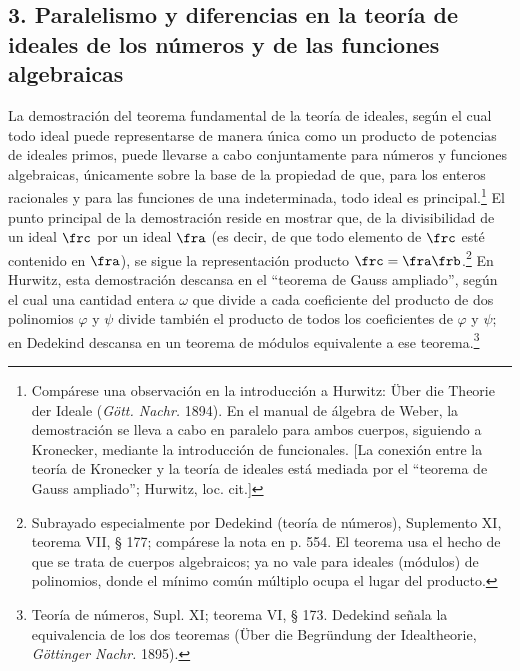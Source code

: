 \documentclass[11pt]{article}
\begin{document}
\subsection*{3. Paralelismo y diferencias en la teoría de ideales de los números y de las funciones algebraicas}
La demostración del teorema fundamental de la teoría de ideales, según el cual todo ideal puede representarse de manera única como un producto de potencias de ideales primos, puede llevarse a cabo conjuntamente para números y funciones algebraicas, únicamente sobre la base de la propiedad de que, para los enteros racionales y para las funciones de una indeterminada, todo ideal es principal.\footnote{Compárese una observación en la introducción a Hurwitz: Über die Theorie der Ideale (\emph{Gött. Nachr.} 1894). En el manual de álgebra de Weber, la demostración se lleva a cabo en paralelo para ambos cuerpos, siguiendo a Kronecker, mediante la introducción de funcionales. [La conexión entre la teoría de Kronecker y la teoría de ideales está mediada por el ``teorema de Gauss ampliado''; Hurwitz, loc. cit.]} El punto principal de la demostración reside en mostrar que, de la divisibilidad de un ideal \(\frc\) por un ideal \(\fra\) (es decir, de que todo elemento de \(\frc\) esté contenido en \(\fra\)), se sigue la representación producto \(\frc=\fra\frb\).\footnote{Subrayado especialmente por Dedekind (teoría de números), Suplemento XI, teorema VII, § 177; compárese la nota en p. 554. El teorema usa el hecho de que se trata de cuerpos algebraicos; ya no vale para ideales (módulos) de polinomios, donde el mínimo común múltiplo ocupa el lugar del producto.} En Hurwitz, esta demostración descansa en el ``teorema de Gauss ampliado'', según el cual una cantidad entera \(\omega\) que divide a cada coeficiente del producto de dos polinomios \(\varphi\) y \(\psi\) divide también el producto de todos los coeficientes de \(\varphi\) y \(\psi\); en Dedekind descansa en un teorema de módulos equivalente a ese teorema.\footnote{Teoría de números, Supl. XI; teorema VI, § 173. Dedekind señala la equivalencia de los dos teoremas (Über die Begründung der Idealtheorie, \emph{Göttinger Nachr.} 1895).}
\end{document}
